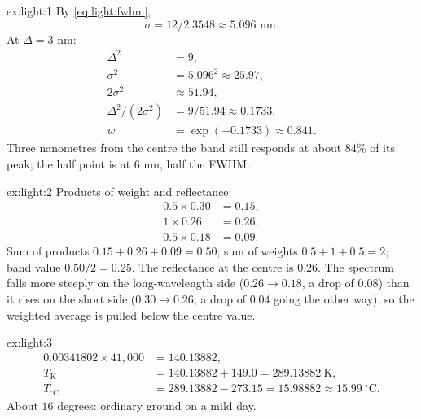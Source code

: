 
\begin{solution}{ex:light:1}
By \cref{eq:light:fwhm},
\[ \sigma = 12 / 2.3548 \approx 5.096 \text{ nm}. \]
At $\Delta = 3$ nm:
\begin{align*}
\Delta^2 &= 9,\\
\sigma^2 &= 5.096^2 \approx 25.97,\\
2\sigma^2 &\approx 51.94,\\
\Delta^2/(2\sigma^2) &= 9/51.94 \approx 0.1733,\\
w &= \exp(-0.1733) \approx 0.841.
\end{align*}
Three nanometres from the centre the band still responds at about $84\%$ of its peak; the half
point is at $6$ nm, half the FWHM.
\end{solution}

\begin{solution}{ex:light:2}
Products of weight and reflectance:
\begin{align*}
0.5 \times 0.30 &= 0.15,\\
1 \times 0.26 &= 0.26,\\
0.5 \times 0.18 &= 0.09.
\end{align*}
Sum of products $0.15 + 0.26 + 0.09 = 0.50$; sum of weights $0.5 + 1 + 0.5 = 2$; band value
$0.50/2 = 0.25$. The reflectance at the centre is $0.26$. The spectrum falls more steeply on the
long-wavelength side ($0.26 \to 0.18$, a drop of $0.08$) than it rises on the short side
($0.30 \to 0.26$, a drop of $0.04$ going the other way), so the weighted average is pulled below
the centre value.
\end{solution}

\begin{solution}{ex:light:3}
\begin{align*}
0.00341802 \times 41{,}000 &= 140.13882,\\
T_{\mathrm{K}} &= 140.13882 + 149.0 = 289.13882\ \mathrm{K},\\
T_{^\circ\mathrm{C}} &= 289.13882 - 273.15 = 15.98882 \approx 15.99\ ^\circ\mathrm{C}.
\end{align*}
About $16$ degrees: ordinary ground on a mild day.
\end{solution}


